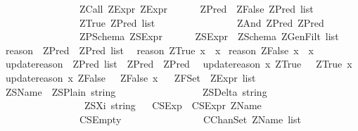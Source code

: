 \begin{isabellebody}
\ \ \ \ \ \ \ \ \ \ \ \ \ \ \ {\isacharbar}\ ZCall\ ZExpr\ ZExpr\isanewline
{}\ \ \ \ \ \ ZPred\ {\isacharequal}\ ZFalse\ {\isachardoublequoteopen}ZPred\ list{\isachardoublequoteclose}\isanewline
\ \ \ \ \ \ \ \ \ \ \ \ \ \ \ {\isacharbar}\ ZTrue\ {\isachardoublequoteopen}ZPred\ list{\isachardoublequoteclose}\isanewline
\ \ \ \ \ \ \ \ \ \ \ \ \ \ \ {\isacharbar}\ ZAnd\ ZPred\ ZPred\isanewline
\ \ \ \ \ \ \ \ \ \ \ \ \ \ \ {\isacharbar}\ ZPSchema\ ZSExpr\isanewline
{}\ \ \ \ \ \ ZSExpr\ {\isacharequal}\ ZSchema\ {\isachardoublequoteopen}ZGenFilt\ list{\isachardoublequoteclose}\isanewline
\ \isanewline
{}\isamarkupfalse%
\ reason\ {\isacharcolon}{\isacharcolon}\ {\isachardoublequoteopen}ZPred\ {\isasymRightarrow}\ ZPred\ list{\isachardoublequoteclose}\isanewline
{}\isanewline
\ \ {\isachardoublequoteopen}reason\ {\isacharparenleft}ZTrue\ x{\isacharparenright}\ {\isacharequal}\ x{\isachardoublequoteclose}\isanewline
{\isacharbar}\ {\isachardoublequoteopen}reason\ {\isacharparenleft}ZFalse\ x{\isacharparenright}\ {\isacharequal}\ x{\isachardoublequoteclose}\isanewline
\isanewline
\ \isanewline
{}\isamarkupfalse%
\ update{\isacharunderscore}reason\ {\isacharcolon}{\isacharcolon}\ {\isachardoublequoteopen}ZPred\ list\ {\isasymRightarrow}\ ZPred\ {\isasymRightarrow}\ ZPred{\isachardoublequoteclose}\isanewline
{}\isanewline
\ \ {\isachardoublequoteopen}update{\isacharunderscore}reason\ x\ {\isacharparenleft}ZTrue\ {\isacharunderscore}{\isacharparenright}\ {\isacharequal}\ {\isacharparenleft}ZTrue\ x{\isacharparenright}{\isachardoublequoteclose}\isanewline
{\isacharbar}\ {\isachardoublequoteopen}update{\isacharunderscore}reason\ x\ {\isacharparenleft}ZFalse\ {\isacharunderscore}{\isacharparenright}\ {\isacharequal}\ {\isacharparenleft}ZFalse\ x{\isacharparenright}{\isachardoublequoteclose}\isanewline
\isanewline
\ \isanewline
{}\isamarkupfalse%
\ ZFSet\ {\isacharequal}\ {\isachardoublequoteopen}ZExpr\ list{\isachardoublequoteclose}\isanewline
\ \isanewline
{}\isamarkupfalse%
\ ZSName\ {\isacharequal}\ ZSPlain\ string\isanewline
\ \ \ \ \ \ \ \ \ \ \ \ \ \ \ \ {\isacharbar}\ ZSDelta\ string\isanewline
\ \ \ \ \ \ \ \ \ \ \ \ \ \ \ \ {\isacharbar}\ ZSXi\ string\isanewline
\ \isanewline
{}\isamarkupfalse%
\ CSExp\ {\isacharequal}\ CSExpr\ ZName\isanewline
\ \ \ \ \ \ \ \ \ \ \ \ \ \ \ {\isacharbar}\ CSEmpty\isanewline
\ \ \ \ \ \ \ \ \ \ \ \ \ \ \ {\isacharbar}\ CChanSet\ {\isachardoublequoteopen}ZName\ list{\isachardoublequoteclose}\isanewline

\end{isabellebody}
